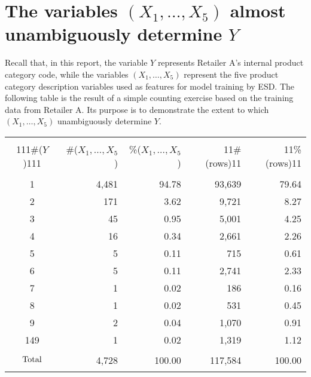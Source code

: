 
\section{The variables $(X_{1}, \ldots, X_{5})$ almost unambiguously determine $Y$}
\setcounter{theorem}{0}
\setcounter{equation}{0}



Recall that, in this report, the variable $Y$ represents Retailer A's
internal product category code, while the variables $(X_{1}, \ldots ,X_{5})$
represent the five product category description variables used as features
for model training by ESD. The following table is the result of a simple
counting exercise based on the training data from Retailer A.
Its purpose is to demonstrate the extent to which $(X_{1}, \ldots ,X_{5})$
unambiguously determine $Y$.

\vskip 0.5cm
\begin{center}
\begin{tabular}{|c|r|r|r|r|}
\hline
&&&&\\
{\color{white}111}\#($Y$){\color{white}111} & \#($X_{1},\ldots,X_{5}$) & \%($X_{1},\ldots,X_{5}$) & {\color{white}11}\#(rows){\color{white}11} & {\color{white}11}\%(rows){\color{white}11} \\
&&&&\\
\hline\hline
1 & 4,481 & 94.78 & 93,639 & 79.64 \\
\hline
2 &   171  &  3.62 &  9,721 &   8.27 \\
\hline
3 &   45  &  0.95 &  5,001 &   4.25 \\
\hline
4 &   16  &  0.34 &  2,661 &   2.26 \\
\hline
5 &   5  &  0.11 &  715 &   0.61 \\
\hline
6 &   5  &  0.11 &  2,741 &   2.33 \\
\hline
7 &   1  &  0.02 &  186 &   0.16 \\
\hline
8 &   1  &  0.02 &  531 &   0.45 \\
\hline
9 &   2  &  0.04 &  1,070 &   0.91 \\
\hline
149 &   1  &  0.02 &  1,319 &   1.12 \\
\hline\hline
$\overset{{\color{white}-}}{\underset{{\color{white}-}}{\textnormal{Total}}}$ &  4,728  & 100.00 &  117,584 & 100.00 \\
\hline
\end{tabular}
\end{center}

